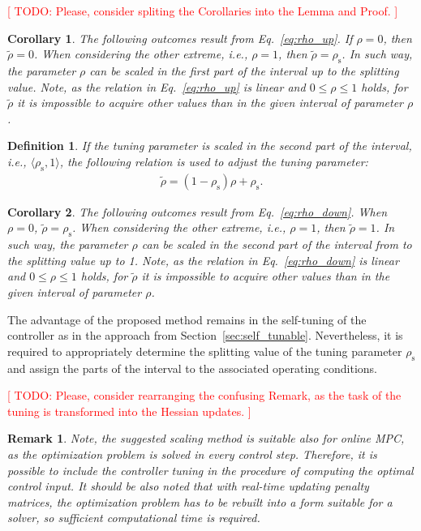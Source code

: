 \documentclass[preprint,12pt]{elsarticle}
\newtheorem{remark}[theorem]{Remark}
\newtheorem{corollary}{Corollary}[theorem]
\newtheorem{definition}{Definition}[section]
\begin{document}
\textcolor{red}{[ TODO: Please, consider spliting the Corollaries into the Lemma and Proof. ]}

\begin{corollary}
	The following outcomes result from Eq.~\eqref{eq:rho_up}. If $\rho=0$, then $\widetilde{\rho} = 0$. When considering the other extreme, i.e., $\rho=1$, then $\widetilde{\rho} = \rho_{\mathrm{s}}$. In such way, the parameter $\rho$ can be scaled in the first part of the interval up to the splitting value. Note, as the relation in Eq.~\eqref{eq:rho_up} is linear and $0 \le \rho \le 1$ holds, for $\widetilde{\rho}$ it is impossible to acquire other values than in the given interval of parameter $\rho$.   
\end{corollary}

\begin{definition}
	If the tuning parameter is scaled in the second part of the interval, i.e., $\langle \rho_{\mathrm{s}}, 1 \rangle$, the following relation is used to adjust the tuning parameter:	
	\begin{eqnarray}
		\label{eq:rho_down}
		\widetilde{\rho} = (1-\rho_{\mathrm{s}}) \rho + \rho_{\mathrm{s}}.
	\end{eqnarray}
\end{definition}

\begin{corollary}
	The following outcomes result from Eq.~\eqref{eq:rho_down}. When $\rho=0$, $\widetilde{\rho} = \rho_{\mathrm{s}}$. When considering the other extreme, i.e., $\rho=1$, then $\widetilde{\rho} = 1$. In such way, the parameter $\rho$ can be scaled in the second part of the interval from to the splitting value up to 1. Note, as the relation in Eq.~\eqref{eq:rho_down} is linear and $0 \le \rho \le 1$ holds, for $\widetilde{\rho}$ it is impossible to acquire other values than in the given interval of parameter $\rho$.
\end{corollary}

The advantage of the proposed method remains in the self-tuning of the controller as in the approach from Section~\ref{sec:self_tunable}. Nevertheless, it is required to appropriately determine the splitting value of the tuning parameter $\rho_{\mathrm{s}}$ and assign the parts of the interval to the associated operating conditions.

\textcolor{red}{[ TODO: Please, consider rearranging the confusing Remark, as the task of the tuning is transformed into the Hessian updates. ]}

\begin{remark}
	Note, the suggested scaling method is suitable also for online MPC, as the optimization problem is solved in every control step. Therefore, it is possible to include the controller tuning in the procedure of computing the optimal control input. It should be also noted that with real-time updating penalty matrices, the optimization problem has to be rebuilt into a form suitable for a solver, so sufficient computational time is required.  
\end{remark}
\end{document}
